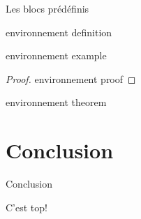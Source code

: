 \documentclass{beamer}
\begin{document}
\begin{frame}{Les blocs prédéfinis}
  \begin{definition}
    environnement definition
  \end{definition}

  \begin{example}
    environnement example
  \end{example}

  \begin{proof}
    environnement proof
  \end{proof}

  \begin{theorem}
    environnement theorem
  \end{theorem}
\end{frame}

\section{Conclusion}

\begin{frame}{Conclusion}
  \begin{block}{}
    C'est top!
  \end{block}
\end{frame}

\frame[plain]{\utcthankspage[Merci !]}
\end{document}
